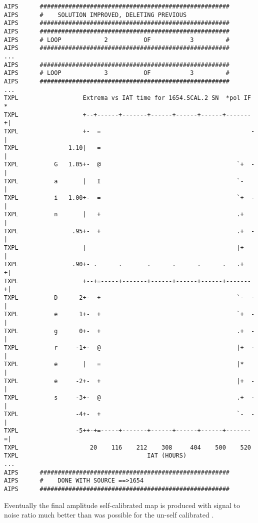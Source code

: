 \clearpage
\begin{verbatim}
AIPS      #####################################################
AIPS      #    SOLUTION IMPROVED, DELETING PREVIOUS
AIPS      #####################################################
AIPS      #####################################################
AIPS      # LOOP            2          OF           3         #
AIPS      #####################################################
...
AIPS      #####################################################
AIPS      # LOOP            3          OF           3         #
AIPS      #####################################################
...
TXPL                  Extrema vs IAT time for 1654.SCAL.2 SN  *pol IF *
TXPL                  +--+------+-------+------+------+------+-------+|
TXPL                  +-  =                                          -|
TXPL              1.10|   =                                           |
TXPL          G   1.05+-  @                                      `+  -|
TXPL          a       |   I                                      `-   |
TXPL          i   1.00+-  =                                      `+  -|
TXPL          n       |   +                                      .+   |
TXPL               .95+-  +                                      .+  -|
TXPL                  |                                          |+   |
TXPL               .90+- .      .       .      .      .      .   .+  +|
TXPL                  +--+=-----+-------+------+------+------+-------+|
TXPL          D      2+-  +                                      `-  -|
TXPL          e      1+-  +                                      `+  -|
TXPL          g      0+-  +                                      .+  -|
TXPL          r     -1+-  @                                      |+  -|
TXPL          e       |   =                                      |*   |
TXPL          e     -2+-  +                                      |+  -|
TXPL          s     -3+-  @                                      .+  -|
TXPL                -4+-  +                                      `-  -|
TXPL                -5++-+=-----+-------+------+------+------+-------=|
TXPL                    20    116    212    308     404    500    520
TXPL                                    IAT (HOURS)
...
AIPS      #####################################################
AIPS      #    DONE WITH SOURCE ==>1654
AIPS      #####################################################
\end{verbatim}

\normalstyle
Eventually the final amplitude self-calibrated map is
produced with signal to noise ratio much better than
was possible for the un-self calibrated \uvdata.

